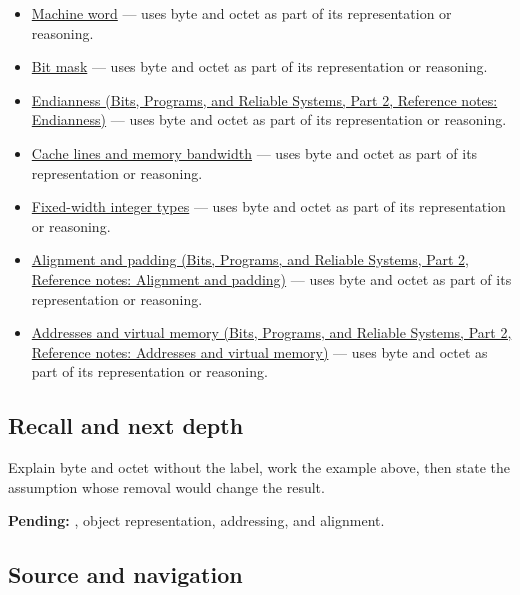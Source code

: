 \hypertarget{appendix-5bee2df85484-used-by}{}

\begin{itemize}
\tightlist
\item
  \hyperref[appendix-d67a19507dc5]{Machine word} --- uses byte and octet as part of its representation or reasoning.
\item
  \hyperref[appendix-dbe5905163c2]{Bit mask} --- uses byte and octet as part of its representation or reasoning.
\item
  \href{../01-Bits-Programs-and-Reliable-Systems-P02/main.pdf\#appendix-bc07c3d25b18}{Endianness (Bits, Programs, and Reliable Systems, Part 2, Reference notes: Endianness)} --- uses byte and octet as part of its representation or reasoning.
\item
  \hyperref[appendix-e4ccdbab8320]{Cache lines and memory bandwidth} --- uses byte and octet as part of its representation or reasoning.
\item
  \hyperref[appendix-cc04044b5782]{Fixed-width integer types} --- uses byte and octet as part of its representation or reasoning.
\item
  \href{../01-Bits-Programs-and-Reliable-Systems-P02/main.pdf\#appendix-a1f7c53b4742}{Alignment and padding (Bits, Programs, and Reliable Systems, Part 2, Reference notes: Alignment and padding)} --- uses byte and octet as part of its representation or reasoning.
\item
  \href{../01-Bits-Programs-and-Reliable-Systems-P02/main.pdf\#appendix-18ee4f913c3c}{Addresses and virtual memory (Bits, Programs, and Reliable Systems, Part 2, Reference notes: Addresses and virtual memory)} --- uses byte and octet as part of its representation or reasoning.
\end{itemize}

\subsection{Recall and next depth}\label{appendix-5bee2df85484-recall-and-next-depth}

\hypertarget{appendix-5bee2df85484-recall-and-next-depth}{}

Explain byte and octet without the label, work the example above, then state the assumption whose removal would change the result.

\textbf{Pending:} , object representation, addressing, and alignment.

\subsection{Source and navigation}\label{appendix-5bee2df85484-source-and-navigation}

